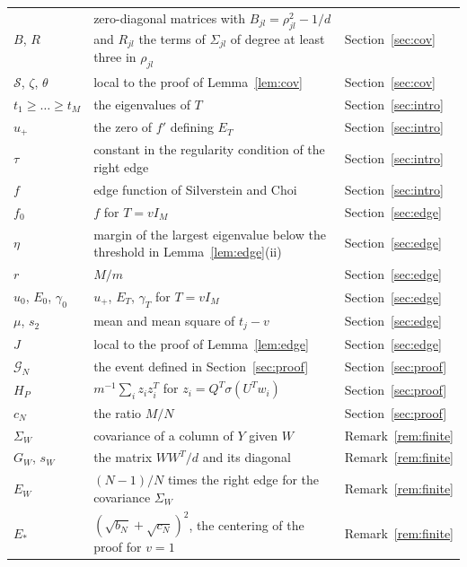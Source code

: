 {\begin{longtable}{@{}p{}p{}l@{}}
$B$, $R$ & zero-diagonal matrices with $B_{jl}=\rho_{jl}^2-1/d$ and $R_{jl}$ the terms of $\Sigma_{jl}$ of degree at least three in $\rho_{jl}$ & Section~\ref{sec:cov} \\
$\mathcal S$, $\zeta$, $\theta$ & local to the proof of Lemma~\ref{lem:cov} & Section~\ref{sec:cov} \\
$t_1\ge\dots\ge t_M$ & the eigenvalues of $T$ & Section~\ref{sec:intro} \\
$u_+$ & the zero of $f'$ defining $E_T$ & Section~\ref{sec:intro} \\
$\tau$ & constant in the regularity condition of the right edge & Section~\ref{sec:intro} \\
$f$ & edge function of Silverstein and Choi & Section~\ref{sec:intro} \\
$f_0$ & $f$ for $T=vI_M$ & Section~\ref{sec:edge} \\
$\eta$ & margin of the largest eigenvalue below the threshold in Lemma~\ref{lem:edge}(ii) & Section~\ref{sec:edge} \\
$r$ & $M/m$ & Section~\ref{sec:edge} \\
$u_0$, $E_0$, $\gamma_0$ & $u_+$, $E_T$, $\gamma_T$ for $T=vI_M$ & Section~\ref{sec:edge} \\
$\mu$, $s_2$ & mean and mean square of $t_j-v$ & Section~\ref{sec:edge} \\
$J$ & local to the proof of Lemma~\ref{lem:edge} & Section~\ref{sec:edge} \\
$\mathcal G_N$ & the event defined in Section~\ref{sec:proof} & Section~\ref{sec:proof} \\
$H_P$ & $m^{-1}\sum_iz_iz_i^{T}$ for $z_i=Q^{T}\sigma(U^{T}w_i)$ & Section~\ref{sec:proof} \\
$c_N$ & the ratio $M/N$ & Section~\ref{sec:proof} \\
$\Sigma_W$ & covariance of a column of $Y$ given $W$ & Remark~\ref{rem:finite} \\
$G_W$, $s_W$ & the matrix $WW^{T}/d$ and its diagonal & Remark~\ref{rem:finite} \\
$E_W$ & $(N-1)/N$ times the right edge for the covariance $\Sigma_W$ & Remark~\ref{rem:finite} \\
$E_*$ & $(\sqrt{b_N}+\sqrt{c_N})^2$, the centering of the proof for $v=1$ & Remark~\ref{rem:finite} \\ \bottomrule
\end{longtable}}
